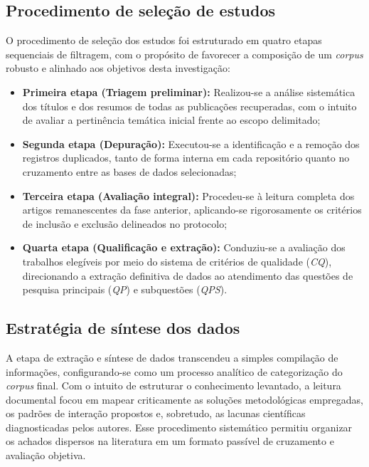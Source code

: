 \documentclass[
	12pt,				%
	oneside,			%
	a4paper,			%
	english,			%
	brazil				%
	]{abntex2ppgsi}
\begin{document}




    \subsection{Procedimento de seleção de estudos}
    \label{procedimentoSelecao}

    O procedimento de seleção dos estudos foi estruturado em quatro etapas sequenciais de filtragem, com o propósito de favorecer a composição de um \textit{corpus} robusto e alinhado aos objetivos desta investigação:

\begin{itemize}
    \item[] \textbf{Primeira etapa (Triagem preliminar):} Realizou-se a análise sistemática dos títulos e dos resumos de todas as publicações recuperadas, com o intuito de avaliar a pertinência temática inicial frente ao escopo delimitado;
    \item[] \textbf{Segunda etapa (Depuração):} Executou-se a identificação e a remoção dos registros duplicados, tanto de forma interna em cada repositório quanto no cruzamento entre as bases de dados selecionadas;
    \item[] \textbf{Terceira etapa (Avaliação integral):} Procedeu-se à leitura completa dos artigos remanescentes da fase anterior, aplicando-se rigorosamente os critérios de inclusão e exclusão delineados no protocolo;
    \item[] \textbf{Quarta etapa (Qualificação e extração):} Conduziu-se a avaliação dos trabalhos elegíveis por meio do sistema de critérios de qualidade (\textit{CQ}), direcionando a extração definitiva de dados ao atendimento das questões de pesquisa principais (\textit{QP}) e subquestões (\textit{QPS}).
\end{itemize}

    \subsection{Estratégia de síntese dos dados}

    A etapa de extração e síntese de dados transcendeu a simples compilação de informações, configurando-se como um processo analítico de categorização do \textit{corpus} final. Com o intuito de estruturar o conhecimento levantado, a leitura documental focou em mapear criticamente as soluções metodológicas empregadas, os padrões de interação propostos e, sobretudo, as lacunas científicas diagnosticadas pelos autores. Esse procedimento sistemático permitiu organizar os achados dispersos na literatura em um formato passível de cruzamento e avaliação objetiva.
\end{document}
